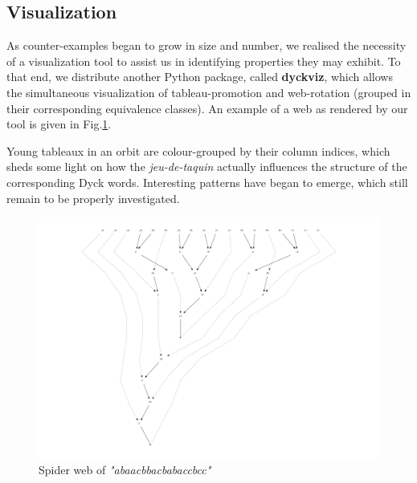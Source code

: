 \documentclass{llncs}
\newcommand{\w}[1]{\textit{"#1"}}
\begin{document}
\subsection{Visualization}
As counter-examples began to grow in size and number, we realised the necessity of a visualization tool to assist us in identifying properties they may exhibit. To that end, we distribute another Python package, called \textbf{dyckviz}, which allows the simultaneous visualization of tableau-promotion and web-rotation (grouped in their corresponding equivalence classes). An example of a web as rendered by our tool is given in Fig.\ref{fig:web}.

Young tableaux in an orbit are colour-grouped by their column indices, which sheds some light on how the \textit{jeu-de-taquin} actually influences the structure of the corresponding Dyck words. Interesting patterns have began to emerge, which still remain to be properly investigated. 

\begin{figure}
\begin{center}
\includegraphics[width=.75\textwidth]{web.pdf}
\caption{Spider web of \w{abaacbbacbabaccbcc}}
\label{fig:web}
\end{center}
\end{figure}
\end{document}
